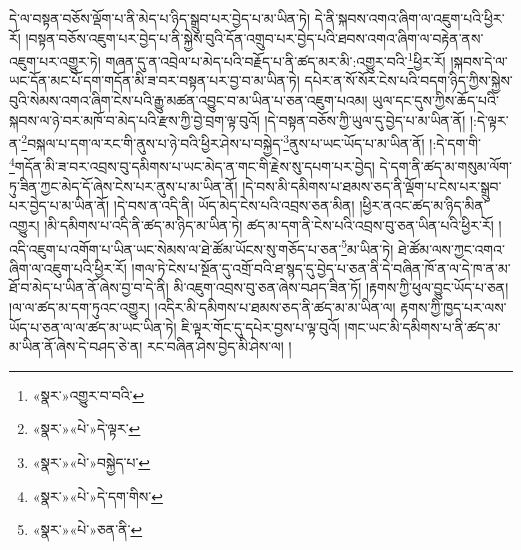 དེ་ལ་བསྟན་བཅོས་ལྡོག་པ་ནི་མེད་པ་ཉིད་སྒྲུབ་པར་བྱེད་པ་མ་ཡིན་ཏེ། དེ་ནི་སྐབས་འགའ་ཞིག་ལ་འཇུག་པའི་ཕྱིར་རོ། །བསྟན་བཅོས་འཇུག་པར་བྱེད་པ་ནི་སྐྱེས་བུའི་དོན་འགྲུབ་པར་བྱེད་པའི་ཐབས་འགའ་ཞིག་ལ་བརྟེན་ནས་འཇུག་པར་འགྱུར་ཏེ། གཞན་དུ་ན་འབྲེལ་པ་མེད་པའི་བརྗོད་པ་ནི་ཚད་མར་མི་:འགྱུར་བའི་\footnote{«སྣར་»འགྱུར་བ་བའི་}ཕྱིར་རོ། །སྐབས་དེ་ལ་ཡང་དོན་མང་པོ་དག་གདོན་མི་ཟ་བར་བསྟན་པར་བྱ་བ་མ་ཡིན་ཏེ། དཔེར་ན་སོ་སོར་ངེས་པའི་བདག་ཉིད་ཀྱིས་སྐྱེས་བུའི་སེམས་འགའ་ཞིག་ངེས་པའི་རྒྱུ་མཚན་འབྱུང་བ་མ་ཡིན་པ་ཅན་འཇུག་པའམ། ཡུལ་དང་དུས་ཀྱིས་ཆོད་པའི་སྐབས་ལ་ཉེ་བར་མཁོ་བ་མེད་པའི་རྫས་ཀྱི་བྱེ་བྲག་ལྟ་བུའོ། །དེ་བསྟན་བཅོས་ཀྱི་ཡུལ་དུ་བྱེད་པ་མ་ཡིན་ནོ། །:དེ་ལྟར་ན་\footnote{«སྣར་»«པེ་»དེ་ལྟར་}བསྐལ་པ་དག་ལ་རང་གི་ནུས་པ་ཉེ་བའི་ཕྱིར་ཤེས་པ་བསྐྱེད་\footnote{«སྣར་»«པེ་»བསྐྱེད་པ་}ནུས་པ་ཡང་ཡོད་པ་མ་ཡིན་ནོ། །:དེ་དག་གི་\footnote{«སྣར་»«པེ་»དེ་དག་གིས་}གདོན་མི་ཟ་བར་འབྲས་བུ་དམིགས་པ་ཡང་མེད་ན་གང་གི་རྗེས་སུ་དཔག་པར་བྱེད། དེ་དག་ནི་ཚད་མ་གསུམ་ལོག་ཏུ་ཟིན་ཀྱང་མེད་དོ་ཞེས་ངེས་པར་ནུས་པ་མ་ཡིན་ནོ། །དེ་བས་མི་དམིགས་པ་ཐམས་ཅད་ནི་ལྡོག་པ་ངེས་པར་སྒྲུབ་པར་བྱེད་པ་མ་ཡིན་ནོ། །དེ་བས་ན་འདི་ནི། ཡོད་མེད་ངེས་པའི་འབྲས་ཅན་མིན། །ཕྱིར་ནའང་ཚད་མ་ཉིད་མིན་འགྱུར། །མི་དམིགས་པ་འདི་ནི་ཚད་མ་ཉིད་མ་ཡིན་ཏེ། ཚད་མ་དག་ནི་ངེས་པའི་འབྲས་བུ་ཅན་ཡིན་པའི་ཕྱིར་རོ། །འདི་འཇུག་པ་འགོག་པ་ཡིན་ཡང་སེམས་ལ་ཐེ་ཚོམ་ཡོངས་སུ་གཅོད་པ་ཅན་\footnote{«སྣར་»«པེ་»ཅན་ནི་}མ་ཡིན་ཏེ། ཐེ་ཚོམ་ལས་ཀྱང་འགའ་ཞིག་ལ་འཇུག་པའི་ཕྱིར་རོ། །གལ་ཏེ་ངེས་པ་སྔོན་དུ་འགྲོ་བའི་ཐ་སྙད་དུ་བྱེད་པ་ཅན་ནི་དེ་བཞིན་ཁོ་ན་ལ་དེ་ཁ་ན་མ་ཐོ་བ་མེད་པ་ཡིན་ནོ་ཞེས་བྱ་བ་དེ་ནི། མི་འཇུག་འབྲས་བུ་ཅན་ཞེས་བཤད་ཟིན་ཏོ། །རྟགས་ཀྱི་ཕུལ་བྱུང་ཡོད་པ་ཅན། །ལ་ལ་ཚད་མ་དག་ཏུའང་འགྱུར། །འདིར་མི་དམིགས་པ་ཐམས་ཅད་ནི་ཚད་མ་མ་ཡིན་ལ། རྟགས་ཀྱི་ཁྱད་པར་ལས་ཡོད་པ་ཅན་ལ་ལ་ཚད་མ་ཡང་ཡིན་ཏེ། ཇི་ལྟར་གོང་དུ་དཔེར་བྱས་པ་ལྟ་བུའོ། །གང་ཡང་མི་དམིགས་པ་ནི་ཚད་མ་མ་ཡིན་ནོ་ཞེས་དེ་བཤད་ཅེ་ན། རང་བཞིན་ཤེས་བྱེད་མི་ཤེས་ལ། །
